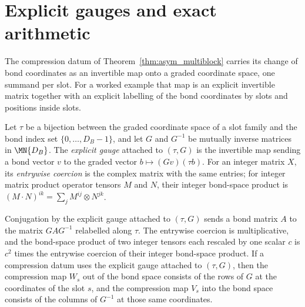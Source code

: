 \section{Explicit gauges and exact arithmetic}%
\label{sec:asymex_explicit_gauge}

The compression datum of Theorem~\ref{thm:asym_multiblock} carries its
change of bond coordinates as an invertible map onto a graded coordinate
space, one summand per slot. For a worked example that map is an explicit
invertible matrix together with an explicit labelling of the bond
coordinates by slots and positions inside slots.

\begin{definition}
    \label{def:asymex_explicit_gauge}
    \leanok
    Let $\tau$ be a bijection between the graded coordinate space of a slot
    family and the bond index set $\{0,\ldots,D_B-1\}$, and let $G$ and
    $G^{-1}$ be mutually inverse matrices in $\MN{D_B}$. The \emph{explicit
        gauge} attached to $(\tau,G)$ is the invertible map sending a bond
    vector $v$ to the graded vector $b\mapsto(Gv)(\tau b)$. For an integer
    matrix $X$, its \emph{entrywise coercion} is the complex matrix with the
    same entries; for integer matrix product operator tensors $M$ and $N$,
    their integer bond-space product is
    $(M\mathbin{\cdot}N)^{ik}=\sum_jM^{ij}\otimes N^{jk}$.
\end{definition}

\begin{theorem}
    \label{thm:asymex_explicit_gauge}
    \leanok
    Conjugation by the explicit gauge attached to $(\tau,G)$ sends a bond
    matrix $A$ to the matrix $GAG^{-1}$ relabelled along $\tau$. The
    entrywise coercion is multiplicative, and the bond-space product of two
    integer tensors each rescaled by one scalar $c$ is $c^2$ times the
    entrywise coercion of their integer bond-space product. If a compression
    datum uses the explicit gauge attached to $(\tau,G)$, then the
    compression map $W_s$ out of the bond space consists of the rows of $G$
    at the coordinates of the slot $s$, and the compression map $V_s$ into
    the bond space consists of the columns of $G^{-1}$ at those same
    coordinates.
\end{theorem}

